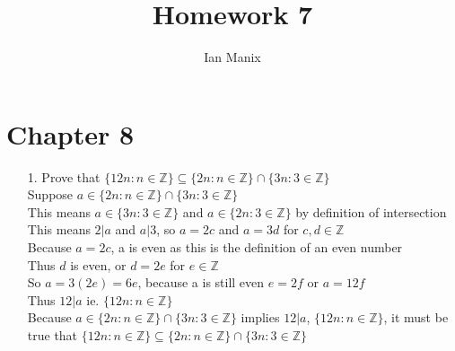 \documentclass[sigconf]{article}
\title{
  \textbf{Homework 7} \\
  }
\author{ 
  Ian Manix
  }
\begin{document}



\maketitle




\section*{Chapter 8}
\begin{itemize}
  \item[1.] Prove that $\{12n:n\in\mathbb{Z}\}\subseteq\{2n:n\in\mathbb{Z}\}\cap\{3n:3\in\mathbb{Z}\}$\\
            Suppose $a\in\{2n:n\in\mathbb{Z}\}\cap\{3n:3\in\mathbb{Z}\}$\\
            This means $a\in\{3n:3\in\mathbb{Z}\}$ and $a\in\{2n:3\in\mathbb{Z}\}$ by definition of intersection\\
            This means $2|a$ and $a|3$, so $a=2c$ and $a=3d$ for $c,d\in\mathbb{Z}$\\
            Because $a=2c$, a is even as this is the definition of an even number\\
            Thus $d$ is even, or $d=2e$ for $e\in\mathbb{Z}$\\
            So $a=3(2e)=6e$, because a is still even $e=2f$ or $a=12f$\\
            Thus $12|a$ ie. $\{12n:n\in\mathbb{Z}\}$\\
            \hspace*{5mm} Because $a\in\{2n:n\in\mathbb{Z}\}\cap\{3n:3\in\mathbb{Z}\}$ implies $12|a$, $\{12n:n\in\mathbb{Z}\}$, it must be true that $\{12n:n\in\mathbb{Z}\}\subseteq\{2n:n\in\mathbb{Z}\}\cap\{3n:3\in\mathbb{Z}\}$



\end{itemize}
\end{document}
